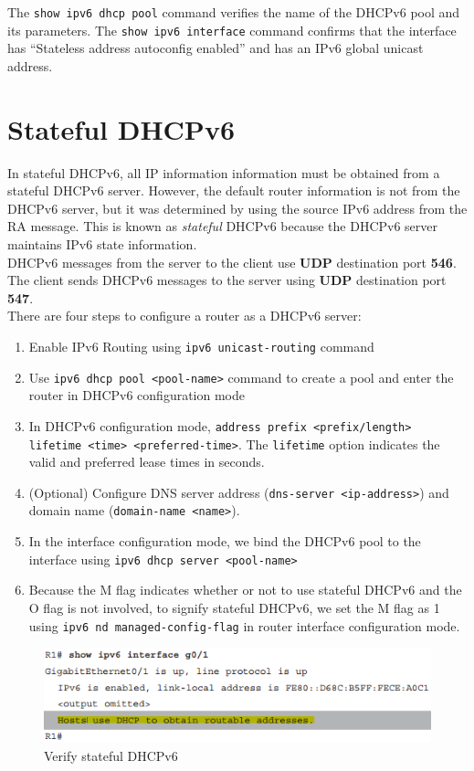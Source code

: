 The \verb|show ipv6 dhcp pool| command verifies the name of the DHCPv6 pool and its parameters. The \verb|show ipv6 interface| command  confirms that the interface has ``Stateless address autoconfig enabled'' and has an IPv6 global unicast address. 

\section{Stateful DHCPv6}

In stateful DHCPv6, all IP information information must be obtained from a stateful DHCPv6 server. However, the default router information is not from the DHCPv6 server, but
it was determined by using the source IPv6 address from the RA message. This is known as \emph{stateful} DHCPv6 because the DHCPv6 server maintains IPv6 state information.\\

DHCPv6 messages from the server to the client use \textbf{UDP} destination port \textbf{546}. The client sends DHCPv6 messages to the server using \textbf{UDP} destination port \textbf{547}.\\

There are four steps to configure a router as a DHCPv6 server:

\begin{enumerate}
\item Enable IPv6 Routing using \verb|ipv6 unicast-routing| command
\item Use \verb|ipv6 dhcp pool <pool-name>| command to create a pool and enter the router in DHCPv6 configuration mode
\item In DHCPv6 configuration mode, \verb|address prefix <prefix/length> lifetime <time> <preferred-time>|. The \verb|lifetime| option indicates the valid and preferred lease times in seconds.
\item (Optional) Configure DNS server address (\verb|dns-server <ip-address>|) and domain name (\verb|domain-name <name>|).
\item In the interface configuration mode, we bind the DHCPv6 pool to the interface using \verb|ipv6 dhcp server <pool-name>|
\item Because the M flag indicates whether or not to use stateful DHCPv6 and the O flag is not involved, to signify stateful DHCPv6, we set the M flag as 1 using \verb|ipv6 nd managed-config-flag| in router interface configuration mode.
\end{enumerate}

\begin{figure}[hbtp]
\caption{Verify stateful DHCPv6}
\centering
\includegraphics[scale=0.8]{pictures/Stateful-DHCPv6.PNG}
\end{figure}


